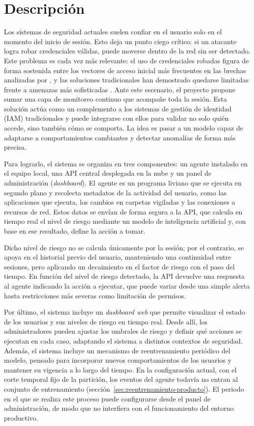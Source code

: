 \section{Descripción}
Los sistemas de seguridad actuales suelen confiar en el usuario solo en el momento del inicio de sesión. Esto deja un punto ciego crítico: si un atacante logra robar credenciales válidas, puede moverse dentro de la red sin ser detectado. Este problema es cada vez más relevante: el uso de credenciales robadas figura de forma sostenida entre los vectores de acceso inicial más frecuentes en las brechas analizadas por \textcite{Verizon2025}, y las soluciones tradicionales han demostrado quedarse limitadas frente a amenazas más sofisticadas \parencite{Ansari2025}. Ante este escenario, el proyecto propone sumar una capa de monitoreo continuo que acompañe toda la sesión. Esta solución actúa como un complemento a los sistemas de gestión de identidad (IAM) tradicionales y puede integrarse con ellos para validar no solo quién accede, sino también cómo se comporta. La idea es pasar a un modelo capaz de adaptarse a comportamientos cambiantes y detectar anomalías de forma más precisa.

Para lograrlo, el sistema se organiza en tres componentes: un agente instalado en el equipo local, una API central desplegada en la nube y un panel de administración (\emph{dashboard}). El agente es un programa liviano que se ejecuta en segundo plano y recolecta metadatos de la actividad del usuario, como las aplicaciones que ejecuta, los cambios en carpetas vigiladas y las conexiones a recursos de red. Estos datos se envían de forma segura a la API, que calcula en tiempo real el nivel de riesgo mediante un modelo de inteligencia artificial y, con base en ese resultado, define la acción a tomar.

Dicho nivel de riesgo no se calcula únicamente por la sesión; por el contrario, se apoya en el historial previo del usuario, manteniendo una continuidad entre sesiones, pero aplicando un decaimiento en el factor de riesgo con el paso del tiempo. En función del nivel de riesgo detectado, la API devuelve una respuesta al agente indicando la acción a ejecutar, que puede variar desde una simple alerta hasta restricciones más severas como limitación de permisos.

Por último, el sistema incluye un \emph{dashboard web} que permite visualizar el estado de los usuarios y sus niveles de riesgo en tiempo real. Desde allí, los administradores pueden ajustar los umbrales de riesgo y definir qué acciones se ejecutan en cada caso, adaptando el sistema a distintos contextos de seguridad. Además, el sistema incluye un mecanismo de reentrenamiento periódico del modelo, pensado para incorporar nuevos comportamientos de los usuarios y mantener su vigencia a lo largo del tiempo. En la configuración actual, con el corte temporal fijo de la partición, los eventos del agente todavía no entran al conjunto de entrenamiento (sección~\ref{sec:reentrenamiento-producto}). El periodo en el que se realiza este proceso puede configurarse desde el panel de administración, de modo que no interfiera con el funcionamiento del entorno productivo.

